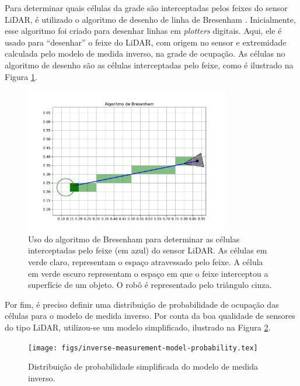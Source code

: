 Para determinar quais células da grade são interceptadas pelos feixes do 
sensor LiDAR, é utilizado o algoritmo de desenho de linha 
de Bresenham \cite{bresenham1965algorithm}. Inicialmente, 
esse algoritmo foi criado para desenhar linhas em \textit{plotters} 
digitais. Aqui, ele é usado para ``desenhar'' o feixe do 
LiDAR, com origem no sensor e extremidade calculada pelo modelo de medida 
inverso, na grade de ocupação. As células no algoritmo de desenho são 
as células interceptadas pelo feixe, como é ilustrado na Figura \ref{fig:bresenham-demo}.

\begin{figure}
  \centering
  \includegraphics[width=0.8\textwidth]{figs/bresenham_demop.pdf}
  \caption[Representação do algoritmo de Bresenham]{Uso do algoritmo de Bresenham para determinar as células 
  interceptadas pelo feixe (em azul) do sensor LiDAR. As células em 
  verde claro, representam o espaço atravessado pelo feixe. A célula 
  em verde escuro representam o espaço em que o feixe interceptou a 
  superfície de um objeto. O robô é representado pelo triângulo cinza.}
  \label{fig:bresenham-demo}
\end{figure}

Por fim, é preciso definir uma distribuição de probabilidade de ocupação 
das células para o modelo de medida inverso. Por conta da boa qualidade 
de sensores do tipo LiDAR, utilizou-se um modelo simplificado, ilustrado 
na Figura \ref{fig:simplified-inv-measurement-model}.

\begin{figure}
  \centering
  \texttt{[image: figs/inverse-measurement-model-probability.tex]}
  \caption[Distribuição de probabilidade simplificada do modelo de 
  medida inverso.]{Distribuição de probabilidade simplificada do modelo de 
  medida inverso.}
  \label{fig:simplified-inv-measurement-model}
\end{figure}

